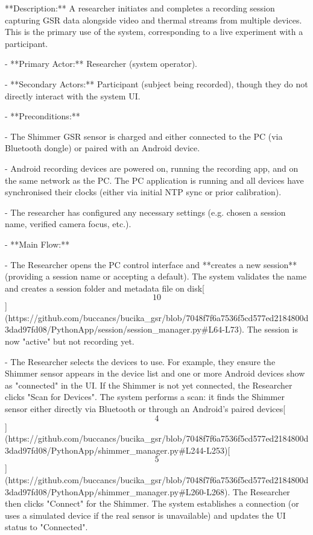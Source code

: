 \documentclass[12pt,a4paper]{article}
\begin{document}
**Description:** A researcher initiates and completes a recording
session capturing GSR data alongside video and thermal streams from
multiple devices. This is the primary use of the system, corresponding
to a live experiment with a participant.

- **Primary Actor:** Researcher (system operator).

- **Secondary Actors:** Participant (subject being recorded), though
  they do not directly interact with the system UI.

- **Preconditions:**

- The Shimmer GSR sensor is charged and either connected to the PC (via
  Bluetooth dongle) or paired with an Android device.

- Android recording devices are powered on, running the recording app,
  and on the same network as the PC. The PC application is running and
  all devices have synchronised their clocks (either via initial NTP
  sync or prior calibration).

- The researcher has configured any necessary settings (e.g. chosen a
  session name, verified camera focus, etc.).

- **Main Flow:**

- The Researcher opens the PC control interface and **creates a new
  session** (providing a session name or accepting a default). The
  system validates the name and creates a session folder and metadata
  file on
  disk[\[10\]](https://github.com/buccancs/bucika_gsr/blob/7048f7f6a7536f5cd577ed2184800d3dad97fd08/PythonApp/session/session_manager.py#L64-L73).
  The session is now "active" but not recording yet.

- The Researcher selects the devices to use. For example, they ensure
  the Shimmer sensor appears in the device list and one or more Android
  devices show as "connected" in the UI. If the Shimmer is not yet
  connected, the Researcher clicks "Scan for Devices". The system
  performs a scan: it finds the Shimmer sensor either directly via
  Bluetooth or through an Android's paired
  devices[\[4\]](https://github.com/buccancs/bucika_gsr/blob/7048f7f6a7536f5cd577ed2184800d3dad97fd08/PythonApp/shimmer_manager.py#L244-L253)[\[5\]](https://github.com/buccancs/bucika_gsr/blob/7048f7f6a7536f5cd577ed2184800d3dad97fd08/PythonApp/shimmer_manager.py#L260-L268).
  The Researcher then clicks "Connect" for the Shimmer. The system
  establishes a connection (or uses a simulated device if the real
  sensor is unavailable) and updates the UI status to "Connected".
\end{document}
